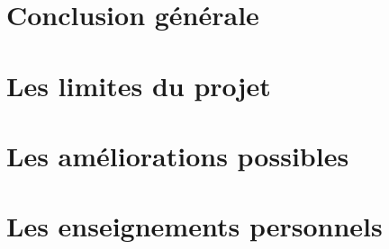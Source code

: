 \section{Conclusion générale}


\section{Les limites du projet}


\section{Les améliorations possibles}


\section{Les enseignements personnels}



